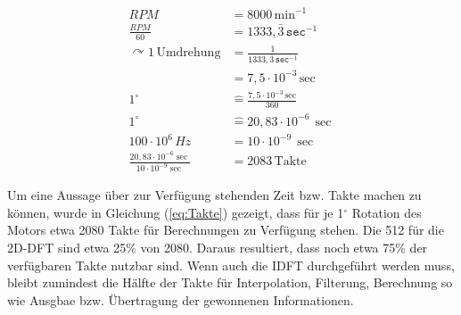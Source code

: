 

 
\begin{align}
    \nonumber RPM &= 8000\, \textrm{min}^{-1}\\[10pt] 
    \frac{RPM}{60} &= 1333,\bar{3}\,\texttt{sec}^{-1}  \\[10pt]
    \nonumber \curvearrowright 1\, \textrm{Umdrehung} &= \frac{1}{1333,\bar{3}\,\texttt{sec}^{-1}} \\[10pt] 
    &= 7,5\cdot 10^{-3}\,\textrm{sec}\\[10pt]
    \nonumber 1^\circ &\widehat{=} \frac{7,5\cdot 10^{-3}\,\textrm{sec}}{360}\\[10pt]
    1^\circ & \widehat{=} 20,83\cdot10^{-6}\,\sec \\[10pt]
    \nonumber 100\cdot10^6\,Hz &= 10\cdot10^{-9}\,\sec \\[10pt]
    \frac{20,83\cdot10^{-6}\sec}{10\cdot10^{-9}\sec} &= 2083\, \textrm{Takte} \label{eq:Takte}
\end{align}


 Um eine Aussage über zur Verfügung stehenden Zeit bzw. Takte machen zu können, wurde in Gleichung (\ref{eq:Takte}) gezeigt, dass für je 1${}^\circ$ Rotation des Motors
 etwa 2080 Takte für Berechnungen zu Verfügung stehen.
 Die 512 für die 2D-DFT sind etwa 25$\%$ von 2080. Daraus resultiert, dass noch etwa 75$\%$ der verfügbaren Takte nutzbar sind. Wenn auch die IDFT durchgeführt werden muss, bleibt 
 zumindest die Hälfte der Takte für Interpolation, Filterung, Berechnung so wie Ausgbae bzw. Übertragung der gewonnenen Informationen. 
 
